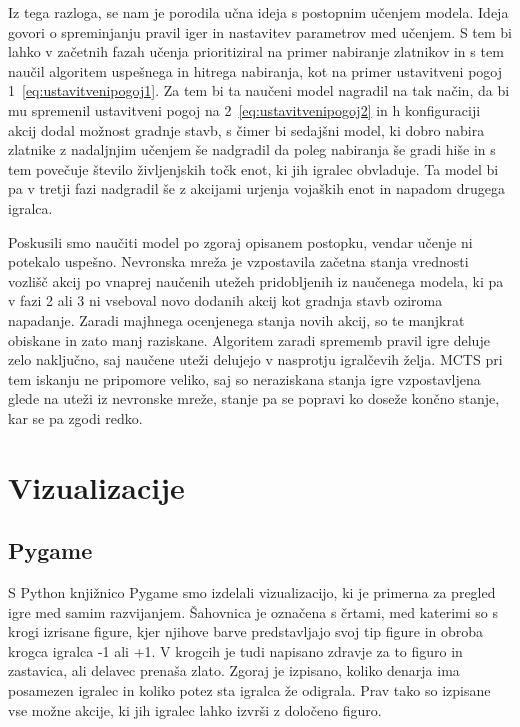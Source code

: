 \documentclass[a4paper, 12pt]{book}
\begin{document}
Iz tega razloga, se nam je porodila učna ideja s postopnim učenjem modela. 
Ideja govori o spreminjanju pravil iger in nastavitev parametrov med učenjem.
S tem bi lahko v začetnih fazah učenja prioritiziral na primer nabiranje zlatnikov in s tem naučil algoritem uspešnega in hitrega nabiranja, kot na primer ustavitveni pogoj 1~\ref{eq:ustavitvenipogoj1}.
Za tem bi ta naučeni model nagradil na tak način, da bi mu spremenil ustavitveni pogoj na 2~\ref{eq:ustavitvenipogoj2} in h konfiguraciji akcij dodal možnost gradnje stavb, s čimer bi sedajšni model, ki dobro nabira zlatnike z nadaljnjim učenjem še nadgradil da poleg nabiranja še gradi hiše in s tem povečuje število življenjskih točk enot, ki jih igralec obvladuje.
Ta model bi pa v tretji fazi nadgradil še z akcijami urjenja vojaških enot in napadom drugega igralca.

Poskusili smo naučiti model po zgoraj opisanem postopku, vendar učenje ni potekalo uspešno.
Nevronska mreža je vzpostavila začetna stanja vrednosti vozlišč akcij po vnaprej naučenih utežeh pridobljenih iz naučenega modela, ki pa v fazi 2 ali 3 ni vseboval novo dodanih akcij kot gradnja stavb oziroma napadanje.
Zaradi majhnega ocenjenega stanja novih akcij, so te manjkrat obiskane in zato manj raziskane.
Algoritem zaradi sprememb pravil igre deluje zelo naključno, saj naučene uteži delujejo v nasprotju igralčevih želja.
MCTS pri tem iskanju ne pripomore veliko, saj so neraziskana stanja igre vzpostavljena glede na uteži iz nevronske mreže, stanje pa se popravi ko doseže končno stanje, kar se pa zgodi redko.





\chapter{Vizualizacije}
\label{chvizualizacija}

\section{Pygame}
S Python knjižnico Pygame smo izdelali vizualizacijo, ki je primerna za pregled igre med samim razvijanjem. 
Šahovnica je označena s črtami, med katerimi so s krogi izrisane figure, kjer njihove barve predstavljajo svoj tip figure in obroba krogca igralca -1 ali +1.
V krogcih je tudi napisano zdravje za to figuro in zastavica, ali delavec prenaša zlato.
Zgoraj je izpisano, koliko denarja ima posamezen igralec in koliko potez sta igralca že odigrala. 
Prav tako so izpisane vse možne akcije, ki jih igralec lahko izvrši z določeno figuro.
\end{document}
